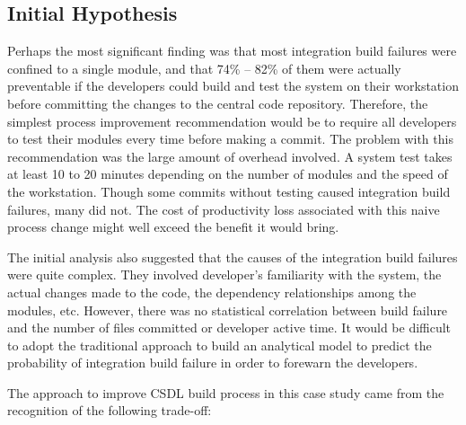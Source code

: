 
\subsection{Initial Hypothesis}


Perhaps the most significant finding was that most integration build failures were confined to a single module, and that  74\% -- 82\% of them were actually preventable if the developers could build and test the system on their workstation before committing the changes to the central code repository. Therefore, the simplest process improvement recommendation would be to require all developers to test their modules every time before making a commit. The problem with this recommendation was the large amount of overhead involved. A system test takes at least 10 to 20 minutes depending on the number of modules and the speed of the workstation. %
Though some commits without testing caused integration build failures, many did not. The cost of productivity loss associated with this naive process change might well exceed the benefit it would bring.


The initial analysis also suggested that the causes of the integration build failures were quite complex. They involved developer's familiarity with the system, the actual changes made to the code, the dependency relationships among the modules, etc. However, there was no statistical correlation between build failure and the number of files committed or developer active time. It would be difficult to adopt the traditional approach to build an analytical model to predict the probability of integration build failure in order to forewarn the developers.


The approach to improve CSDL build process in this case study came from the recognition of the following trade-off: 

